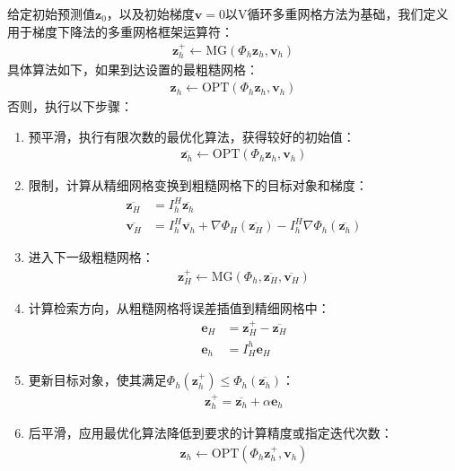 \documentclass[10pt,aspectratio=169]{beamer} %
\renewcommand{\vec}[1]{\boldsymbol{#1}} %
\begin{document}
\begin{frame}[allowframebreaks]
    给定初始预测值$\vec{z}_0$，以及初始梯度$\vec{v}=0$以V循环多重网格方法为基础，我们定义用于梯度下降法的多重网格框架运算符：
    \begin{align*}
        \vec{z}_h^+\leftarrow\mathrm{MG}\left( \Phi_h \vec{z}_h, \vec{v}_h \right)
    \end{align*}
    具体算法如下，如果到达设置的最粗糙网格：
    \begin{align*}
        \vec{z}_h\leftarrow\mathrm{OPT}\left( \Phi_h \vec{z}_h, \vec{v}_h \right)
    \end{align*}
    否则，执行以下步骤：
    \begin{enumerate}
        \item 预平滑，执行有限次数的最优化算法，获得较好的初始值：
        \begin{align*}
            \overline{\vec{z}_h}\leftarrow\mathrm{OPT}\left( \Phi_h \vec{z}_h, \vec{v}_h \right)
        \end{align*}
        \item 限制，计算从精细网格变换到粗糙网格下的目标对象和梯度：
        \begin{align*}
            \overline{\vec{z}_H}&=I_h^H\overline{\vec{z}_h}\\
            \overline{\vec{v}_H}&=I_h^H\overline{\vec{v}_h}+\nabla \Phi_H (\overline{\vec{z}_H})- I_h^H \nabla \Phi_h (\overline{\vec{z}_h})
        \end{align*}
        \item 进入下一级粗糙网格：
        \begin{align*}
            \vec{z}_H^+\leftarrow\mathrm{MG}\left( \Phi_h, \overline{\vec{z}_H}, \overline{\vec{v}_H} \right)
        \end{align*}
        \item 计算检索方向，从粗糙网格将误差插值到精细网格中：
        \begin{align*}
            \vec{e}_H&=\vec{z}_H^+ - \overline{\vec{z}_H}\\
            \vec{e}_h&=I_H^h \vec{e}_H
        \end{align*}
        \item 更新目标对象，使其满足$\Phi_h (\vec{z}_h^+) \leq \Phi_h (\overline{\vec{z}_h})$：
        \begin{align*}
            \vec{z}_h^+ = \overline{\vec{z}_h}+\alpha \vec{e}_h
        \end{align*}
        \item 后平滑，应用最优化算法降低到要求的计算精度或指定迭代次数：
        \begin{align*}
            \vec{z}_h\leftarrow\mathrm{OPT}\left( \Phi_h \vec{z}_h^+, \vec{v}_h \right)
        \end{align*}
    \end{enumerate}
\end{frame}
\end{document}
